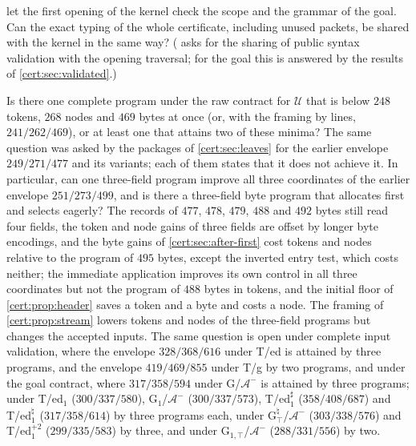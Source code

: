 \begin{question}
 let the first opening of the kernel check
the scope and the grammar of the goal. Can the exact typing of the whole
certificate, including unused packets, be shared with the kernel in the same
way? ( asks for the sharing of public syntax
validation with the opening traversal; for the goal this is answered by the
results of \cref{cert:sec:validated}.)
\end{question}

\begin{question}
Is there one complete program under the raw contract for $\mathcal U$ that is
below $248$ tokens, $268$ nodes and $469$ bytes at once (or, with the framing
by lines, $241/262/469$), or at least one that attains two of these minima?
The same question was asked by the packages of \cref{cert:sec:leaves} for the
earlier envelope $249/271/477$ and its variants; each of them states that it
does not achieve it. In particular, can one three-field program
improve all three coordinates of the earlier envelope $251/273/499$, and is
there a three-field byte program that allocates first and selects eagerly?
The records of $477$, $478$, $479$, $488$ and $492$ bytes still read four fields, the
token and node gains of three fields are offset by longer byte encodings, and
the byte gains of \cref{cert:sec:after-first} cost tokens and nodes relative to
the program of $495$ bytes, except the inverted entry test, which costs
neither; the immediate application improves its own control in all three
coordinates but not the program of $488$ bytes in tokens, and the initial floor
of \cref{cert:prop:header} saves a token and a byte and costs a node. The
framing of \cref{cert:prop:stream} lowers tokens and nodes of the three-field
programs but changes the accepted inputs. The same question is open under
complete input validation, where the envelope $328/368/616$ under T/ed is
attained by three programs, and the envelope $419/469/855$ under T/g by two
programs, and under the goal contract, where $317/358/594$ under
G/$\mathcal A^{-}$ is attained by three programs; under T/ed$_1$
($300/337/580$), G$_1$/$\mathcal A^{-}$ ($300/337/573$), T/ed$_1^{\sharp}$ ($358/408/687$)
and T/ed$_1^{\natural}$ ($317/358/614$) by three programs each, under
G$^{\natural}_{\top}$/$\mathcal A^{-}$ ($303/338/576$) and T/ed$_1^{+2}$ ($299/335/583$) by three,
and under G$_{1,\top}$/$\mathcal A^{-}$ ($288/331/556$) by two.

\end{question}
